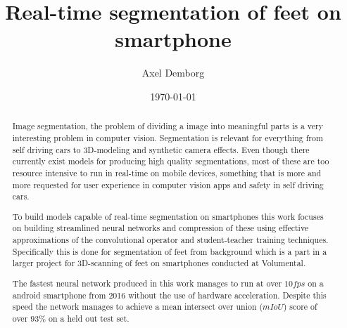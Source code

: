 \documentclass{kththesis}
\title{Real-time segmentation of feet on smartphone}
\author{Axel Demborg}
\date{\today}
\begin{document}
\listoftodos

\frontmatter

\titlepage

\begin{abstract}

  Image segmentation, the problem of dividing a image into meaningful parts is a
  very interesting problem in computer vision. Segmentation is relevant for
  everything from self driving cars to 3D-modeling and synthetic camera effects.
  Even though there currently exist models for producing high quality
  segmentations, most of these are too resource intensive to run in real-time on
  mobile devices, something that is more and more requested for user experience
  in computer vision apps and safety in self driving cars.

  To build models capable of real-time segmentation on smartphones this work
  focuses on building streamlined neural networks and compression of these using
  effective approximations of the convolutional operator and student-teacher
  training techniques. Specifically this is
  done for segmentation of feet from background which is a part in a larger
  project for 3D-scanning of feet on smartphones conducted at Volumental.

  The fastest neural network produced in this work manages to run at over \(10
  fps\) on a android smartphone from 2016 without the use of hardware
  acceleration. Despite this speed the network manages to achieve a mean
  intersect over union (\(mIoU\)) score of over \(93\%\) on a held out test set.

\end{abstract}
\end{document}
